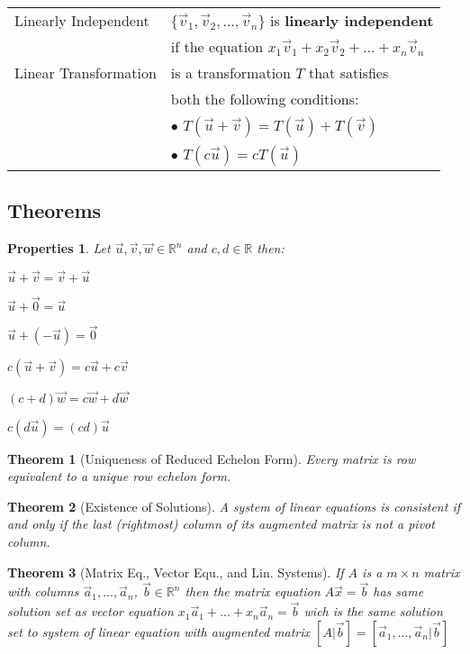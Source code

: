 \documentclass[5pt]{article}
\begin{document}
\begin{multicols}{2}
\begin{tabular}{ll}
Linearly Independent  & $\{\vec{v}_1, \vec{v}_2, ..., \vec{v}_n\}$ is \textbf{linearly independent}\\
                      & if the equation $x_1\vec{v}_1 + x_2\vec{v}_2 + ... + x_n\vec{v}_n$\\
Linear Transformation & is a transformation $T$ that satisfies\\
                      & both the following conditions:\\
                      & $\bullet$ $T(\vec{u}+\vec{v}) = T(\vec{u}) + T(\vec{v})$\\
                      & $\bullet$ $T(c\vec{u})=cT(\vec{u})$\\
\end{tabular}

\subsection{Theorems}
\newtheorem{theorem}{Theorem}
\newtheorem{properties}{Properties}

\begin{properties}
  Let $\vec{u},\vec{v}, \vec{w}\in \mathbb{R}^n$ and $c,d\in\mathbb{R}$ then:
  \begin{itemize*}
    \item $\vec{u}+\vec{v}=\vec{v}+\vec{u}$
    \item $\vec{u}+\vec{0}=\vec{u}$
    \item $\vec{u}+(-\vec{u})=\vec{0}$
    \item $c(\vec{u}+\vec{v})=c\vec{u}+c\vec{v}$
    \item $(c+d)\vec{w}=c\vec{w}+d\vec{w}$
    \item $c(d\vec{u})=(cd)\vec{u}$
  \end{itemize*}
\end{properties}

\begin{theorem}[Uniqueness of Reduced Echelon Form]
  Every matrix is row equivalent to a unique row echelon form.
\end{theorem}

\begin{theorem}[Existence of Solutions]
  A system of linear equations is consistent if and only if the last (rightmost) column of its augmented
matrix is not a pivot column.
\end{theorem}

\begin{theorem}[Matrix Eq., Vector Equ., and Lin. Systems]
  If $A$ is a $m\times n$ matrix  with columns $\vec{a}_1, ..., \vec{a}_n$, $\vec{b}\in\mathbb{R}^n$ 
  then the matrix equation $A\vec{x}=\vec{b}$ has same solution set as vector equation $x_1\vec{a}_1 + ... + x_n\vec{a}_n=\vec{b}$  
  wich is the same solution set to system of linear equation with augmented matrix 
  $\left[A|\vec{b}\right]=\left[\vec{a}_1, ..., \vec{a}_n|\vec{b}\right]$ 
\end{theorem}


\end{multicols}
\end{document}

